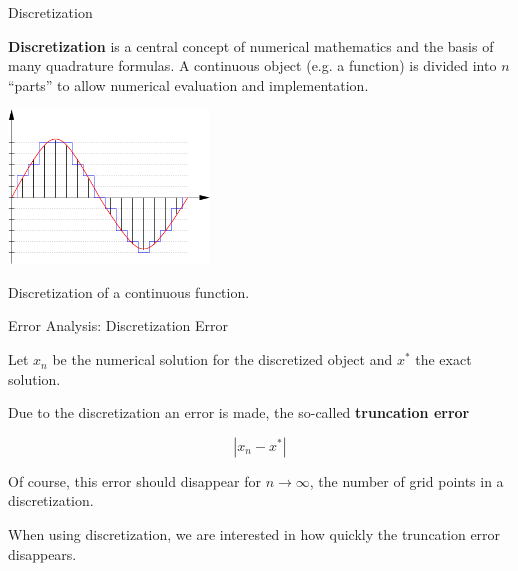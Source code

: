 \begin{vbframe}{Discretization}

\textbf{Discretization} is a central concept of numerical mathematics and the basis of many quadrature formulas. A continuous object (e.g. a function) is divided into $n$ \enquote{parts} to allow numerical evaluation and implementation.

\vspace*{0.2cm}

%

\begin{center}
\includegraphics[width=0.4\textwidth]{figure_man/diskretisierung.png}\\
\begin{footnotesize}
Discretization of a continuous function.
\end{footnotesize}
\end{center}

\end{vbframe}

\begin{vbframe}{Error Analysis: Discretization Error}

Let $x_n$ be the numerical solution for the discretized object and $x^*$ the exact solution.

\lz

Due to the discretization an error is made, the so-called \textbf{truncation error}

$$
|x_n - x^*|
$$

Of course, this error should disappear for $n \to \infty$, the number of grid points in a discretization.

\lz

When using discretization, we are interested in how quickly the truncation error disappears.

\end{vbframe}

